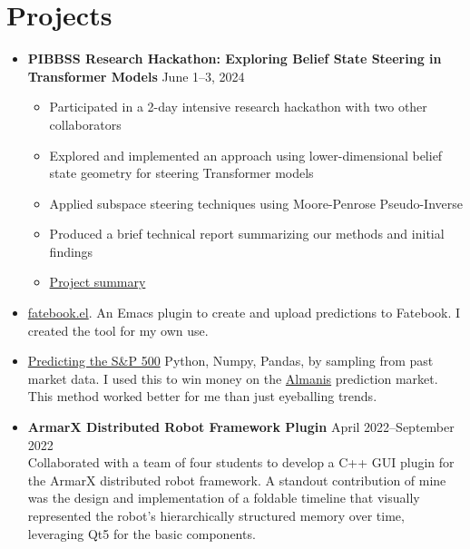 \documentclass[letterpaper,10pt]{article}
\begin{document}
\section*{Projects}
\begin{itemize}
    \item \textbf{PIBBSS Research Hackathon: Exploring Belief State Steering in Transformer Models} \hfill June 1--3, 2024 \\
      \begin{itemize}
          \item Participated in a 2-day intensive research hackathon with two other collaborators
          \item Explored and implemented an approach using lower-dimensional belief state geometry for steering Transformer models
          \item Applied subspace steering techniques using Moore-Penrose Pseudo-Inverse
          \item Produced a brief technical report summarizing our methods and initial findings
          \item \href{https://github.com/sonofhypnos/CV/blob/main/steering-models-belief-states.pdf}{Project summary}
      \end{itemize}
	\item \href{https://github.com/sonofhypnos/fatebook.el}{fatebook.el}. An Emacs plugin to create and upload predictions to Fatebook. I created the tool for my own use.
	\item \href{https://sonofhypnos.github.io/blog/prediction/python/2021/01/30/sp500.html}{Predicting the S\&P 500} Python, Numpy, Pandas, by sampling from past market data. I used this to win money on the \href{https://www.almanisprivate.com/}{Almanis} prediction market. This method worked better for me than just eyeballing trends.
  \item \textbf{ArmarX Distributed Robot Framework Plugin} \hfill April 2022--September 2022 \\
        Collaborated with a team of four students to develop a C++ GUI plugin for the
        ArmarX distributed robot framework. A standout contribution of mine was the
        design and implementation of a foldable timeline that visually represented the
        robot's hierarchically structured memory over time, leveraging Qt5 for the basic components.
\end{itemize}
\end{document}
